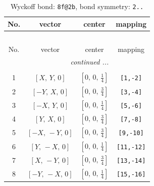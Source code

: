 \documentclass[fleqn,8pt]{jsarticle}
\begin{document}
\begin{longtable}{cccc}
\caption{Wyckoff bond: {\tt 8f@2b}, bond symmetry: {\tt 2..}}
 \\
 \hline \hline
No. & vector & center & mapping \\ \hline \endfirsthead

\multicolumn{3}{l}{\tablename\ \thetable{}} \\
 \hline \hline
No. & vector & center & mapping \\ \hline \endhead

 \hline \hline
\multicolumn{3}{r}{\footnotesize\it continued ...} \\ \endfoot

 \hline \hline
\multicolumn{3}{r}{} \\ \endlastfoot

1 & $\left[ X,\, Y,\, 0 \right]$ & $\left[ 0,\, 0,\, \frac{1}{4} \right]$ & {\tt [1,-2]} \\ \hline
2 & $\left[ - Y,\, X,\, 0 \right]$ & $\left[ 0,\, 0,\, \frac{3}{4} \right]$ & {\tt [3,-4]} \\ \hline
3 & $\left[ - X,\, Y,\, 0 \right]$ & $\left[ 0,\, 0,\, \frac{1}{4} \right]$ & {\tt [5,-6]} \\ \hline
4 & $\left[ Y,\, X,\, 0 \right]$ & $\left[ 0,\, 0,\, \frac{3}{4} \right]$ & {\tt [7,-8]} \\ \hline
5 & $\left[ - X,\, - Y,\, 0 \right]$ & $\left[ 0,\, 0,\, \frac{3}{4} \right]$ & {\tt [9,-10]} \\ \hline
6 & $\left[ Y,\, - X,\, 0 \right]$ & $\left[ 0,\, 0,\, \frac{1}{4} \right]$ & {\tt [11,-12]} \\ \hline
7 & $\left[ X,\, - Y,\, 0 \right]$ & $\left[ 0,\, 0,\, \frac{3}{4} \right]$ & {\tt [13,-14]} \\ \hline
8 & $\left[ - Y,\, - X,\, 0 \right]$ & $\left[ 0,\, 0,\, \frac{1}{4} \right]$ & {\tt [15,-16]} \\
\end{longtable}
\renewcommand{\arraystretch}{1.2}
\end{document}
